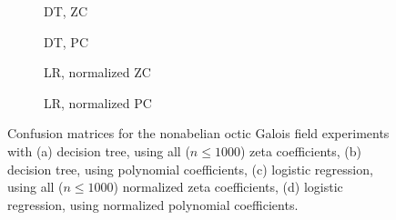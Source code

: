 \documentclass[letterpaper, 10pt]{article}
\newcommand{\1}{\mathds{1}}	%
\theoremstyle{definition}
\theoremstyle{remark}
\begin{document}
\begin{figure}[h]
    \centering
    \begin{subfigure}[t]{0.23\textwidth}
        \centering
        \caption{DT, ZC}
        \label{fig:octic_ab_dt_zc}
    \end{subfigure}
    \hfill
    \begin{subfigure}[t]{0.23\textwidth}
        \centering
        \caption{DT, PC}
        \label{fig:octic_nab_dt_pc}
    \end{subfigure}
    \hfill
    \begin{subfigure}[t]{0.23\textwidth}
        \centering
        \caption{LR, normalized ZC}
        \label{fig:octic_nab_lr_zc_normalized}
    \end{subfigure}
    \hfill
    \begin{subfigure}[t]{0.23\textwidth}
        \centering
        \caption{LR, normalized PC}
        \label{fig:octic_nab_lr_pc_normalized}
    \end{subfigure}
    \caption{Confusion matrices for the nonabelian octic Galois field experiments with (a) decision tree, using all ($n \le 1000$) zeta coefficients, (b) decision tree, using polynomial coefficients, (c) logistic regression, using all ($n \le 1000$) normalized zeta coefficients, (d) logistic regression, using normalized polynomial coefficients.}
    \label{fig:galois_8_ab_cm}
\end{figure}
\end{document}
